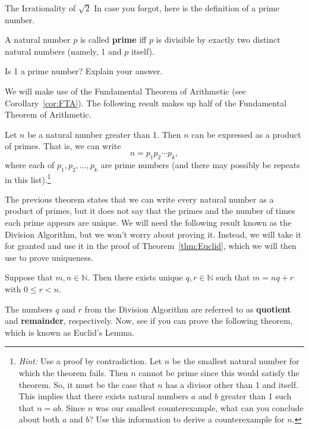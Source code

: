 \begin{section}{The Irrationality of $\sqrt{2}$}
In case you forgot, here is the definition of a prime number.

\begin{definition}
A natural number $p$ is called \textbf{prime} iff $p$ is divisible by exactly two distinct natural numbers (namely, 1 and $p$ itself).
\end{definition}

\begin{exercise}
Is 1 a prime number?  Explain your answer.
\end{exercise}

We will make use of the Fundamental Theorem of Arithmetic (see Corollary~\ref{cor:FTA}).  The following result makes up half of the Fundamental Theorem of Arithmetic.

\begin{theorem}\label{thm:prodprimes}
Let $n$ be a natural number greater than 1.  Then $n$ can be expressed as a product of primes.  That is, we can write
\[
n=p_1 p_2 \cdots p_k,
\]
where each of $p_1, p_2, \ldots, p_k$ are prime numbers (and there may possibly be repeats in this list).\footnote{\emph{Hint:} Use a proof by contradiction.  Let $n$ be the smallest natural number for which the theorem fails.  Then $n$ cannot be prime since this would satisfy the theorem.  So, it must be the case that $n$ has a divisor other than 1 and itself.  This implies that there exists natural numbers $a$ and $b$ greater than 1 such that $n=ab$.  Since $n$ was our smallest counterexample, what can you conclude about both $a$ and $b$?  Use this information to derive a counterexample for $n$.}
\end{theorem}

The previous theorem states that we can write every natural number as a product of primes, but it does not say that the primes and the number of times each prime appears are unique.  We will need the following result known as the Division Algorithm, but we won't worry about proving it.  Instead, we will take it for granted and use it in the proof of Theorem~\ref{thm:Euclid}, which we will then use to prove uniqueness.

\begin{theorem}
Suppose that $m,n\in\mathbb{N}$.  Then there exists unique $q,r\in\mathbb{N}$ such that $m=nq+r$ with $0\leq r<n$.
\end{theorem}
The numbers $q$ and $r$ from the Division Algorithm are referred to as \textbf{quotient} and \textbf{remainder}, respectively.  Now, see if you can prove the following theorem, which is known as Euclid's Lemma.


\end{section}
